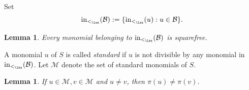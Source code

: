 \documentclass[12pt]{amsart}
\numberwithin{equation}{section}
\newcommand{\Bc}{\mathcal{B}}
\newcommand{\cM}{\mathcal{M}}
\newcommand{\Gc}{\mathcal{G}}
\newtheorem{Lemma}[Theorem]{Lemma}
\begin{document}
Set   
\[
{\rm in}_{<_{\lex}}(\Bc) := \{{\rm in}_{<_{\lex}}(u) : u \in \Bc\}.
\]

\begin{Lemma}
Every monomial belonging to ${\rm in}_{<_{\lex}}(\Bc)$ is squarefree.   
\end{Lemma}


A monomial $u$ of $S$ is called {\em standard} if $u$ is not divisible by any monomial in ${\rm in}_{<_{\lex}}(\Bc)$.  Let $\cM$ denote the set of standard monomials of $S$.

\begin{Lemma}
    If $u \in \cM, v \in \cM$ and $u \neq v$, then $\pi(u) \neq \pi(v)$.
\end{Lemma}
\end{document}
